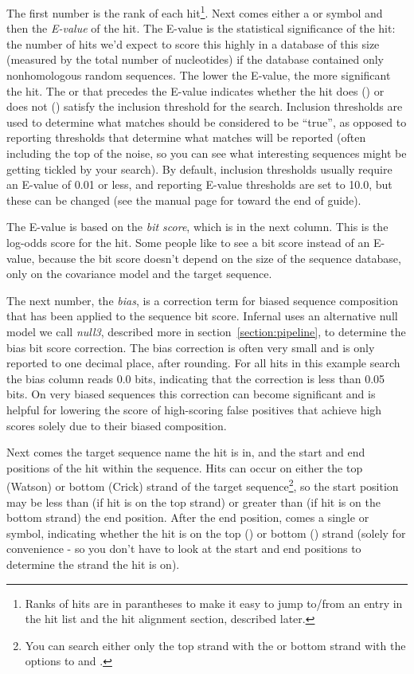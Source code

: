The first number is the rank of each hit\footnote{Ranks of hits are in
  parantheses to make it easy to jump to/from an entry in the hit list
  and the hit alignment section, described later.}. Next comes either a
\otext{!} or  symbol and then the \emph{E-value} of the hit.
The E-value is the statistical significance of the hit: the number of
hits we'd expect to score this highly in a database of this size
(measured by the total number of nucleotides) if the database
contained only nonhomologous random sequences. The lower the E-value,
the more significant the hit. The \otext{!} or  that
precedes the E-value indicates whether the hit does (\otext{!}) or
does not () satisfy the inclusion threshold for the search.
Inclusion thresholds are used to determine what matches should be
considered to be ``true'', as opposed to reporting thresholds that
determine what matches will be reported (often including the top of
the noise, so you can see what interesting sequences might be getting
tickled by your search). By default, inclusion thresholds usually
require an E-value of 0.01 or less, and reporting E-value thresholds
are set to 10.0, but these can be changed (see the manual page for
 toward the end of guide).

The E-value is based on the \emph{bit score}, which is in the next
column. This is the log-odds score for the hit. Some people like to
see a bit score instead of an E-value, because the bit score doesn't
depend on the size of the sequence database, only on the covariance
model and the target sequence.

The next number, the \emph{bias}, is a correction term for biased
sequence composition that has been applied to the sequence bit
score. Infernal uses an alternative null model we call \emph{null3},
described more in section~\ref{section:pipeline}, to determine the bias
bit score correction. The bias correction is often very small and is
only reported to one decimal place, after rounding. For all hits in
this example search the bias column reads 0.0 bits, indicating that
the correction is less than 0.05 bits. On very biased sequences this
correction can become significant and is helpful for lowering the
score of high-scoring false positives that achieve high scores solely
due to their biased composition. 

Next comes the target sequence name the hit is in, and the start and
end positions of the hit within the sequence. Hits can occur on either
the top (Watson) or bottom (Crick) strand of the target
sequence\footnote{You can search either only the top strand with the
 or bottom strand with the  options
to  and .}, so the start position may be
less than (if hit is on the top strand) or greater than (if hit is on
the bottom strand) the end position. After the end position, comes a single
\otext{+} or \otext{-} symbol, indicating whether the hit is on the
top (\otext{+}) or bottom (\otext{-}) strand (solely for convenience -
so you don't have to look at the start and end positions to determine
the strand the hit is on).


